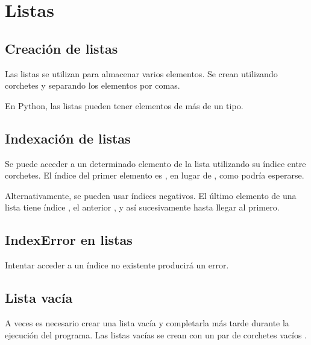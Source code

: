 \chapter{Listas}

\section{Creación de listas}

Las listas se utilizan para almacenar varios elementos. Se crean utilizando corchetes y separando los elementos por comas.


En Python, las listas pueden tener elementos de más de un tipo.


\section{Indexación de listas}

Se puede acceder a un determinado elemento de la lista utilizando su índice entre corchetes. El índice del primer elemento es , en lugar de , como podría esperarse.


Alternativamente, se pueden usar índices negativos. El último elemento de una lista tiene índice , el anterior , y así sucesivamente hasta llegar al primero.


\section{IndexError en listas}

Intentar acceder a un índice no existente producirá un error.


\section{Lista vacía}

A veces es necesario crear una lista vacía y completarla más tarde durante la ejecución del programa. Las listas vacías se crean con un par de corchetes vacíos \ttt{[]}.

